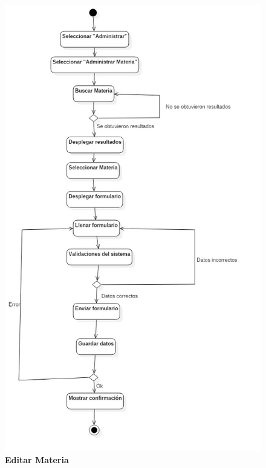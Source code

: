 \begin{figure}[H]
  \centering
    \includegraphics[scale=.6,angle=0]{project/Actividades/Editar_Materia.jpg}
  \caption{\textbf{Editar Materia}}
\end{figure}
